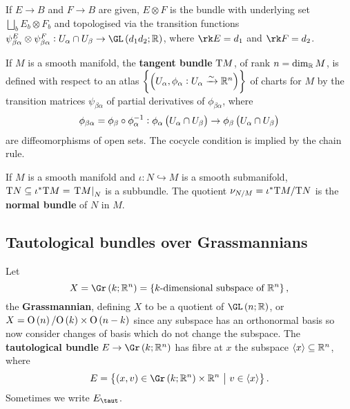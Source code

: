 \begin{example*}
If $ E \to B $ and $ F \to B $ are given, $ E \otimes F $ is the bundle with underlying set $ \bigsqcup_b E_b \otimes F_b $ and topologised via the transition functions $ \psi_{\beta\alpha}^E \otimes \psi_{\beta\alpha}^F : U_\alpha \cap U_\beta \to \GL\br{d_1d_2; \RR} $, where $ \rk E = d_1 $ and $ \rk F = d_2 $.
\end{example*}

\begin{example*}
If $ M $ is a smooth manifold, the \textbf{tangent bundle} $ \mathrm{T} M $, of rank $ n = \dim_{\mathbb{R}} M $, is defined with respect to an atlas $ \cbr{\br{U_\alpha, \phi_\alpha : U_\alpha \xrightarrow{\sim} \RR^n}} $ of charts for $ M $ by the transition matrices $ \psi_{\beta\alpha} $ of partial derivatives of $ \phi_{\beta\alpha} $, where
$$ \phi_{\beta\alpha} = \phi_\beta \circ \phi_\alpha^{-1} : \phi_\alpha\br{U_\alpha \cap U_\beta} \to \phi_\beta\br{U_\alpha \cap U_\beta} $$
are diffeomorphisms of open sets. The cocycle condition is implied by the chain rule.
\end{example*}

\begin{example*}
If $ M $ is a smooth manifold and $ \iota : N \hookrightarrow M $ is a smooth submanifold, $ \mathrm{T} N \subseteq \iota^*\mathrm{T} M = \left. \mathrm{T} M \right|_N $ is a subbundle. The quotient $ \nu_{N / M} = \iota^*\mathrm{T} M / \mathrm{T} N $ is the \textbf{normal bundle} of $ N $ in $ M $.
\end{example*}

\subsection{Tautological bundles over Grassmannians}

\begin{example*}
Let
$$ X = \Gr\br{k; \RR^n} = \cbr{\text{$ k $-dimensional subspace of} \ \RR^n}, $$
the \textbf{Grassmannian}, defining $ X $ to be a quotient of $ \GL\br{n; \RR} $, or $ X = \O\br{n} / \O\br{k} \times \O\br{n - k} $ since any subspace has an orthonormal basis so now consider changes of basis which do not change the subspace. The \textbf{tautological bundle} $ E \to \Gr\br{k; \RR^n} $ has fibre at $ x $ the subspace $ \left\langle x \right\rangle \subseteq \mathbb{R}^n $, where
$$ E = \cbr{\br{x, v} \in \Gr\br{k; \RR^n} \times \RR^n \st v \in \abr{x}}. $$
Sometimes we write $ E_{\taut} $.
\end{example*}

\pagebreak

